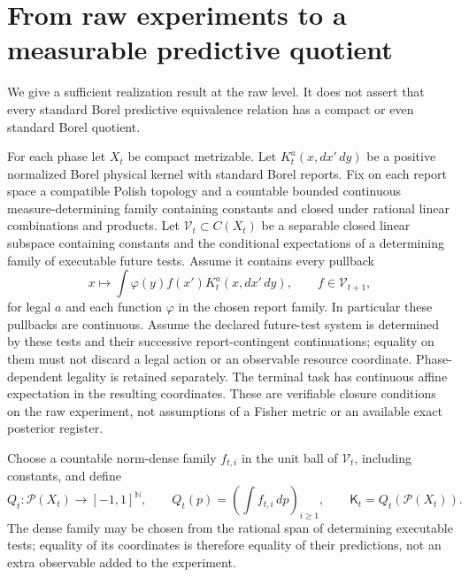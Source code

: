 \section{From raw experiments to a measurable predictive quotient}\label{sec:quotient}
We give a sufficient realization result at the raw level. It does not assert that every standard Borel predictive equivalence relation has a compact or even standard Borel quotient.

For each phase let $X_t$ be compact metrizable. Let
$K_t^a(x,dx'\,dy)$ be a positive normalized Borel physical kernel with standard Borel reports. Fix on each report space a compatible Polish topology and a countable bounded continuous measure-determining family containing constants and closed under rational linear combinations and products. Let $\mathcal V_t\subset C(X_t)$ be a separable closed linear subspace containing constants and the conditional expectations of a determining family of executable future tests. Assume it contains every pullback
\begin{equation}\label{eq:raw_pullback}
 x\longmapsto\int \varphi(y)f(x')K_t^a(x,dx'\,dy),
 \qquad f\in\mathcal V_{t+1},
\end{equation}
for legal $a$ and each function $\varphi$ in the chosen report family. In particular these pullbacks are continuous. Assume the declared future-test system is determined by these tests and their successive report-contingent continuations; equality on them must not discard a legal action or an observable resource coordinate. Phase-dependent legality is retained separately. The terminal task has continuous affine expectation in the resulting coordinates. These are verifiable closure conditions on the raw experiment, not assumptions of a Fisher metric or an available exact posterior register.

Choose a countable norm-dense family $f_{t,i}$ in the unit ball of $\mathcal V_t$, including constants, and define
\begin{equation}\label{eq:raw_quotient}
 Q_t:\mathcal P(X_t)\longrightarrow[-1,1]^{\mathbb N},\qquad
 Q_t(p)=(\int f_{t,i}\,dp)_{i\ge1},\qquad
 \mathsf K_t=Q_t(\mathcal P(X_t)).
\end{equation}
The dense family may be chosen from the rational span of determining executable tests; equality of its coordinates is therefore equality of their predictions, not an extra observable added to the experiment.

